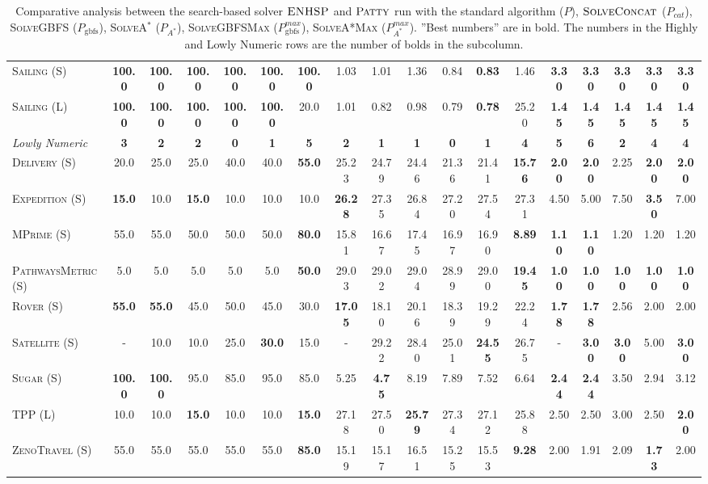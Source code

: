 \documentclass[11pt,landscape]{article}
\begin{document}
\begin{table*}[tb]
{\begin{tabular}{|l||cccccc||cccccc||ccccc||}
\textsc{Sailing} (S)&\textbf{100.0}&\textbf{100.0}&\textbf{100.0}&\textbf{100.0}&\textbf{100.0}&\textbf{100.0}&1.03&1.01&1.36&0.84&\textbf{0.83}&1.46&\textbf{3.30}&\textbf{3.30}&\textbf{3.30}&\textbf{3.30}&\textbf{3.30}\\
\textsc{Sailing} (L)&\textbf{100.0}&\textbf{100.0}&\textbf{100.0}&\textbf{100.0}&\textbf{100.0}&20.0&1.01&0.82&0.98&0.79&\textbf{0.78}&25.20&\textbf{1.45}&\textbf{1.45}&\textbf{1.45}&\textbf{1.45}&\textbf{1.45}
\\\hline
\textit{Lowly Numeric}&\textbf{3}&\textbf{2}&\textbf{2}&\textbf{0}&\textbf{1}&\textbf{5}&\textbf{2}&\textbf{1}&\textbf{1}&\textbf{0}&\textbf{1}&\textbf{4}&\textbf{5}&\textbf{6}&\textbf{2}&\textbf{4}&\textbf{4}\\\hline
\textsc{Delivery} (S)&20.0&25.0&25.0&40.0&40.0&\textbf{55.0}&25.23&24.79&24.46&21.36&21.41&\textbf{15.76}&\textbf{2.00}&\textbf{2.00}&2.25&\textbf{2.00}&\textbf{2.00}\\
\textsc{Expedition} (S)&\textbf{15.0}&10.0&\textbf{15.0}&10.0&10.0&10.0&\textbf{26.28}&27.35&26.84&27.20&27.54&27.31&4.50&5.00&7.50&\textbf{3.50}&7.00\\
\textsc{MPrime} (S)&55.0&55.0&50.0&50.0&50.0&\textbf{80.0}&15.81&16.67&17.45&16.97&16.90&\textbf{8.89}&\textbf{1.10}&\textbf{1.10}&1.20&1.20&1.20\\
\textsc{PathwaysMetric} (S)&5.0&5.0&5.0&5.0&5.0&\textbf{50.0}&29.03&29.02&29.04&28.99&29.00&\textbf{19.45}&\textbf{1.00}&\textbf{1.00}&\textbf{1.00}&\textbf{1.00}&\textbf{1.00}\\
\textsc{Rover} (S)&\textbf{55.0}&\textbf{55.0}&45.0&50.0&45.0&30.0&\textbf{17.05}&18.10&20.16&18.39&19.29&22.24&\textbf{1.78}&\textbf{1.78}&2.56&2.00&2.00\\
\textsc{Satellite} (S)&-&10.0&10.0&25.0&\textbf{30.0}&15.0&-&29.22&28.40&25.01&\textbf{24.55}&26.75&-&\textbf{3.00}&\textbf{3.00}&5.00&\textbf{3.00}\\
\textsc{Sugar} (S)&\textbf{100.0}&\textbf{100.0}&95.0&85.0&95.0&85.0&5.25&\textbf{4.75}&8.19&7.89&7.52&6.64&\textbf{2.44}&\textbf{2.44}&3.50&2.94&3.12\\
\textsc{TPP} (L)&10.0&10.0&\textbf{15.0}&10.0&10.0&\textbf{15.0}&27.18&27.50&\textbf{25.79}&27.34&27.12&25.88&2.50&2.50&3.00&2.50&\textbf{2.00}\\
\textsc{ZenoTravel} (S)&55.0&55.0&55.0&55.0&55.0&\textbf{85.0}&15.19&15.17&16.51&15.25&15.53&\textbf{9.28}&2.00&1.91&2.09&\textbf{1.73}&2.00
\\\hline

        \end{tabular}}
        \caption{Comparative analysis between the search-based solver $\textsc{ENHSP}$ and  $\textsc{Patty}$ run with the standard algorithm ($P$),  $\textsc{SolveConcat}$ ($P_{cat}$), \textsc{SolveGBFS} ($P_\text{gbfs}$), \textsc{SolveA}$^*$ ($P_{A^*}$), \textsc{SolveGBFSMax} ($P_\text{gbfs}^{max}$), \textsc{SolveA*Max} ($P_{A^*}^{max}$). ''Best numbers'' are in bold.  The numbers in the Highly and Lowly Numeric rows are the number of bolds in the subcolumn.}
        \label{tab:experiments}
        \end{table*}
        
\end{document}
